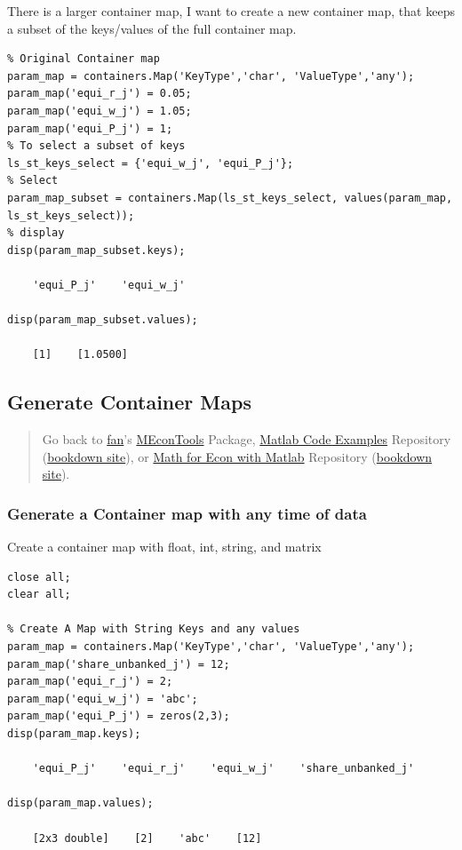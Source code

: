 \documentclass[
]{book}
\begin{document}
There is a larger container map, I want to create a new container map,
that keeps a subset of the keys/values of the full container map.

\begin{verbatim}
% Original Container map
param_map = containers.Map('KeyType','char', 'ValueType','any');
param_map('equi_r_j') = 0.05;
param_map('equi_w_j') = 1.05;
param_map('equi_P_j') = 1;
% To select a subset of keys
ls_st_keys_select = {'equi_w_j', 'equi_P_j'};
% Select
param_map_subset = containers.Map(ls_st_keys_select, values(param_map, ls_st_keys_select));
% display
disp(param_map_subset.keys);

    'equi_P_j'    'equi_w_j'

disp(param_map_subset.values);

    [1]    [1.0500]
\end{verbatim}

\hypertarget{generate-container-maps}{%
\subsection{Generate Container Maps}\label{generate-container-maps}}

\begin{quote}
Go back to \href{http://fanwangecon.github.io/}{fan}'s \href{https://fanwangecon.github.io/MEconTools/}{MEconTools} Package, \href{https://fanwangecon.github.io/M4Econ/}{Matlab Code Examples} Repository (\href{https://fanwangecon.github.io/M4Econ/bookdown}{bookdown site}), or \href{https://fanwangecon.github.io/Math4Econ/}{Math for Econ with Matlab} Repository (\href{https://fanwangecon.github.io/Math4Econ/bookdown}{bookdown site}).
\end{quote}

\hypertarget{generate-a-container-map-with-any-time-of-data}{%
\subsubsection{Generate a Container map with any time of data}\label{generate-a-container-map-with-any-time-of-data}}

Create a container map with float, int, string, and matrix

\begin{verbatim}
close all;
clear all;

% Create A Map with String Keys and any values
param_map = containers.Map('KeyType','char', 'ValueType','any');
param_map('share_unbanked_j') = 12;
param_map('equi_r_j') = 2;
param_map('equi_w_j') = 'abc';
param_map('equi_P_j') = zeros(2,3);
disp(param_map.keys);

    'equi_P_j'    'equi_r_j'    'equi_w_j'    'share_unbanked_j'

disp(param_map.values);

    [2x3 double]    [2]    'abc'    [12]
\end{verbatim}
\end{document}
